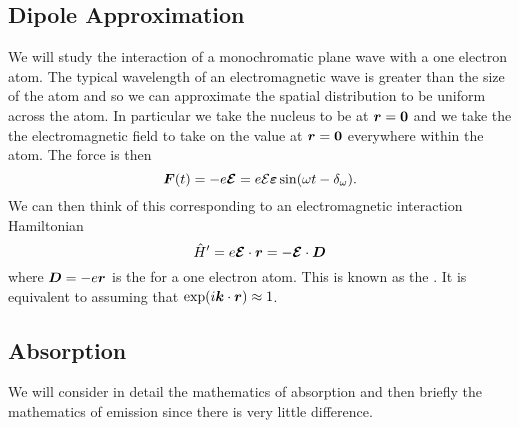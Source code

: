 \documentclass[a4paper]{article}
\newcommand{\Efield}{\mathcal{E}}
\begin{document}
    \subsection{Dipole Approximation}
    We will study the interaction of a monochromatic plane wave with a one electron atom.
    The typical wavelength of an electromagnetic wave is greater than the size of the atom\footnotemark{} and so we can approximate the spatial distribution to be uniform across the atom.
    In particular we take the nucleus to be at \(\bm{r} = \bm{0}\) and we take the the electromagnetic field to take on the value at \(\bm{r} = \bm{0}\) everywhere within the atom.
    The force is then
    \[\vv{F}(t) = -e\vv{\Efield} = e\Efield\vv{\varepsilon}\sin(\omega t - \delta_{\omega}).\]
    We can then think of this corresponding to an electromagnetic interaction Hamiltonian
    \[\operator{H}' = e\vv{\Efield}\cdot\vv{r} = -\vv{\Efield}\cdot\vv{D}\]
    where \(\bm{D} = -e\bm{r}\) is the  for a one electron atom.
    This is known as the .
    It is equivalent to assuming that \(\exp(i\bm{k}\cdot\bm{r}) \approx 1\).
    
    \subsection{Absorption}\label{sec:absorption}
    We will consider in detail the mathematics of absorption and then briefly the mathematics of emission since there is very little difference.
    
\end{document}
